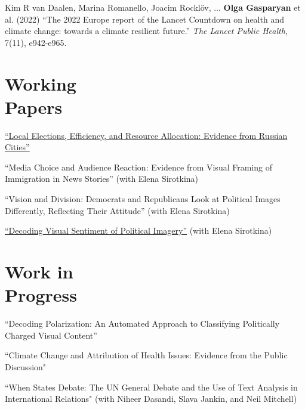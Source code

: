 \documentclass[margin,line,10.95pt]{res}
\begin{document}
\begin{resume}
\vspace*{-2.5mm}

Kim R van Daalen, Marina Romanello, Joacim Rocklöv, ... \textbf{Olga Gasparyan} et al. (2022) ``The 2022 Europe report of the Lancet Countdown on health and climate change: towards a climate resilient future.'' \textit{The Lancet Public Health}, 7(11), e942-e965.


\section{\sc Working \\ Papers}
\href{https://olgasparyan.com/documents/jmp_feb.pdf}{``Local Elections, Efficiency, and Resource Allocation: Evidence from Russian Cities''}

\vspace*{-2.5mm}

``Media Choice and Audience Reaction: Evidence from Visual Framing of Immigration in News Stories'' (with Elena Sirotkina)

\vspace*{-2.5mm}
``Vision and Division: Democrats and Republicans Look at Political Images Differently, Reflecting Their Attitude'' (with Elena Sirotkina)

\vspace*{-2.5mm}
\href{https://arxiv.org/abs/2408.04103}{``Decoding Visual Sentiment of Political Imagery''} (with Elena Sirotkina)


\section{\sc Work in \\ Progress}
``Decoding Polarization: An Automated Approach to Classifying Politically Charged Visual
Content''

\vspace*{-2.5mm}

``Climate Change and Attribution of Health Issues: Evidence from the Public Discussion" 

\vspace*{-3.5mm}
``When States Debate: The UN General Debate and the Use of Text Analysis in International Relations" (with Niheer Dasandi, Slava Jankin, and Neil Mitchell)


\end{resume}
\end{document}
